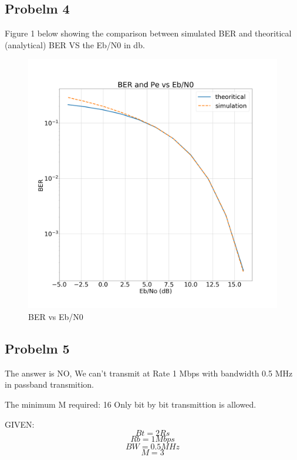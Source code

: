 \documentclass[a4paper,12pt]{report}
\begin{document}
    \subsection{Probelm 4}
        Figure 1 below showing the comparison between simulated BER and theoritical (analytical) BER
        VS the Eb/N0 in db.
        \begin{figure}[h!]
            \includegraphics[width=\linewidth]{Figures/Figure_1.png}
            \caption{BER vs Eb/N0}
            \label{fig:BER}
        \end{figure}

    \subsection{Probelm 5}
        The answer is NO,
        We can't transmit at Rate 1 Mbps with bandwidth 0.5 MHz in passband transmition.

        The minimum M required: 16
        Only bit by bit transmittion is allowed.

        GIVEN:
        \begin{equation*}
            Bt = 2Rs
        \end{equation*}
        \begin{equation*}
            Rb = 1 Mbps
        \end{equation*}
        \begin{equation*}
            BW = 0.5 MHz
        \end{equation*}
        \begin{equation*}
            M = 3
        \end{equation*}
\end{document}
